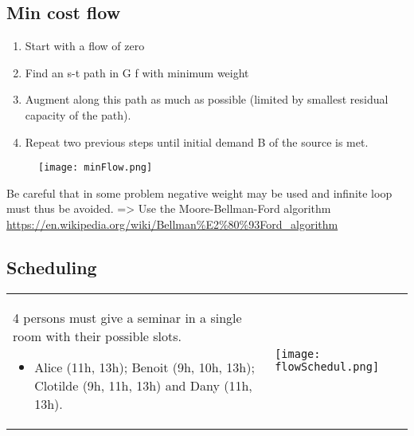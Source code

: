 \subsection{Min cost flow}
\begin{enumerate}
    \item Start with a flow of zero
    \item  Find an s-t path in G f with minimum weight
    \item  Augment along this path as much as possible (limited by
        smallest
        residual capacity of the path).
    \item  Repeat two previous steps until initial demand B of the source
        is met.
\end{enumerate}

\begin{figure}[!ht]
    \centering
    \texttt{[image: minFlow.png]}
\end{figure}

Be careful that in some problem negative weight may be used and infinite
loop must thus be avoided. => Use the Moore-Bellman-Ford algorithm
\url{https://en.wikipedia.org/wiki/Bellman%E2%80%93Ford_algorithm} 


\subsection{Scheduling}

\begin{tabular}{m{8cm}m{7cm}}
4 persons must give a seminar in a
single room with their possible slots.
\begin{itemize}
    \item  Alice (11h, 13h); Benoit (9h, 10h, 13h);
        Clotilde (9h, 11h, 13h) and Dany (11h, 13h).
\end{itemize}
&
\texttt{[image: flowSchedul.png]}
\end{tabular}



